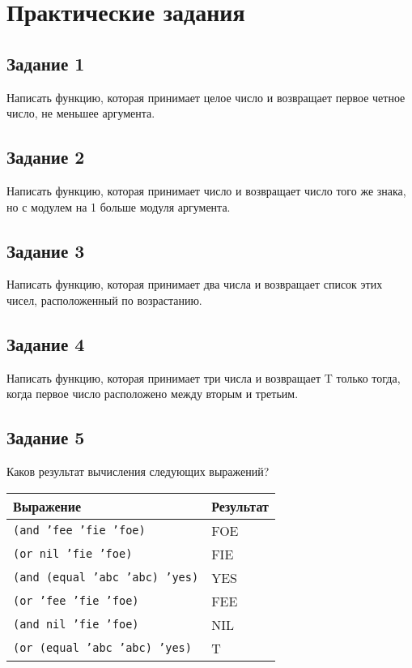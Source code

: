 \chapter{Практические задания}

\section{Задание 1}

Написать функцию, которая принимает целое число и возвращает первое четное число, не меньшее аргумента.


\section{Задание 2}

Написать функцию, которая принимает число и возвращает число того же знака, но с модулем на 1 больше модуля аргумента.


\section{Задание 3}

Написать функцию, которая принимает два числа и возвращает список этих чисел, расположенный по возрастанию.


\section{Задание 4}
\label{sec:t4}

Написать функцию, которая принимает три числа и возвращает T только тогда, когда первое число расположено между вторым и третьим.


\section{Задание 5}

Каков результат вычисления следующих выражений?

\begin{table}[H]
	\begin{tabularx}{\textwidth}{|X|X|}
		\hline
		Выражение & Результат \\ \hline
		\texttt{(and 'fee 'fie 'foe)} & FOE \\ \hline
		\texttt{(or nil 'fie 'foe)} & FIE \\ \hline
		\texttt{(and (equal 'abc 'abc) 'yes)} & YES \\ \hline
		\texttt{(or 'fee 'fie 'foe)} & FEE \\ \hline
		\texttt{(and nil 'fie 'foe)} & NIL \\ \hline
		\texttt{(or (equal 'abc 'abc) 'yes)} & T \\ \hline
	\end{tabularx}
\end{table}

